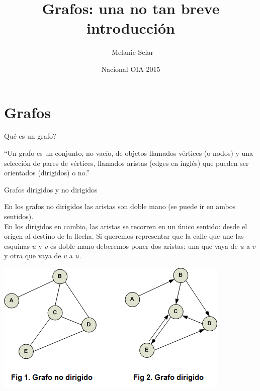 \documentclass[compress]{beamer}
\title[Grafos: una no tan breve introducción] %
{Grafos: una no tan breve introducción}
\author[Melanie Sclar] %
{~Melanie Sclar}
\institute[UBA] %
{
  Facultad de Ciencias Exactas y Naturales\\
  Universidad de Buenos Aires
}
\date[Nacional OIA 2015] %
{Nacional OIA 2015}
\begin{document}
\begin{frame}
  \titlepage
\end{frame}

\section{Grafos}
\begin{frame}{\textquestiondown Qué es un grafo?}
\begin{exampleblock}{}
  {\large ``Un grafo es un conjunto, no vacío, de objetos llamados vértices (o nodos) y una selección de pares de vértices, llamados aristas (edges en inglés) que pueden ser orientados (dirigidos) o no.''}
  \vskip5mm
  \hspace*{}
\end{exampleblock}
  \pause
{}
\end{frame}

\begin{frame}{Grafos dirigidos y no dirigidos}

{\small

En los grafos no dirigidos las aristas son doble mano (se puede ir en ambos sentidos). \\
En los dirigidos en cambio, las aristas se recorren en un único sentido: desde el origen al destino de la flecha. Si queremos representar que la calle que une las esquinas $u$ y $v$ es doble mano deberemos poner dos aristas: una que vaya de $u$ a $v$ y otra que vaya de $v$ a $u$.}

\begin{center}
\includegraphics[scale=0.75]{grafos-dirigidos-y-no-dirigidos.png}
\end{center}
\end{frame}
\end{document}

